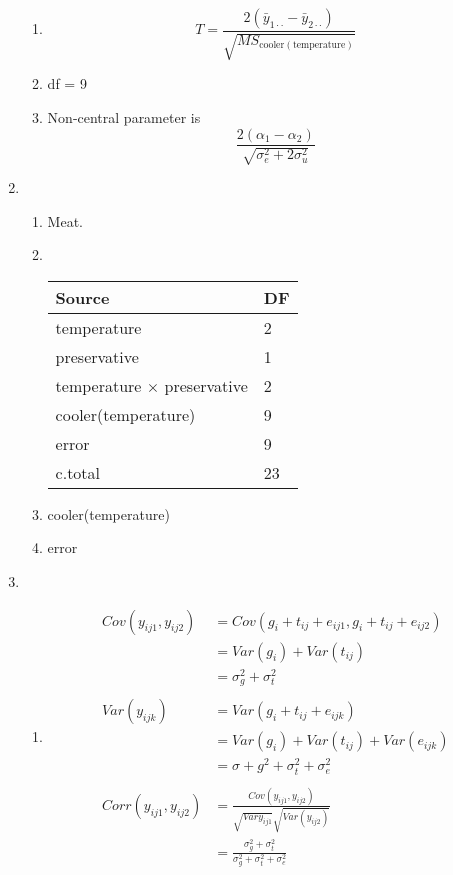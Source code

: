 \documentclass{article}
\begin{document}
\begin{enumerate}[leftmargin = 0 em, label = \arabic*., font = \bfseries]
\begin{enumerate}
	\item 
	\[T = \frac{2 (\bar{y}_{1 \cdot \cdot } - \bar{y}_{2 \cdot \cdot})}{\sqrt{MS_{\mathrm{cooler(temperature)}}}}\]

	\item 
	df = 9 
	\item 
	Non-central parameter is 
	\[\frac{2 (\alpha_1 - \alpha_2)}{\sqrt{\sigma_e^2 + 2 \sigma_{u}^2}}\]

	\end{enumerate}

	\item 
	\begin{enumerate}
		\item 
	Meat.
	\item \ 

	\begin{tabular}{ll}
	\toprule
	Source & DF \\
	\midrule
	temperature & 2\\
	preservative & 1\\
	temperature $\times$ preservative & 2 \\
	cooler(temperature) & 9\\
	error & 9\\
	\midrule
	c.total & 23 \\
	\bottomrule
	\end{tabular}

	\item 
	cooler(temperature)

	\item 
	error
		\end{enumerate}

	\item 
	\begin{enumerate}
		\item 
		\begin{align*}
		Cov(y_{ij1}, y_{ij2}) &= Cov(g_i + t_{ij} + e_{ij1} , g_i + t_{ij} + e_{ij2})\\
		& = Var(g_i) + Var(t_{ij})\\
		& = \sigma_g^2 + \sigma_t^2\\
		\\
		Var(y_{ijk}) & = Var(g_i + t_{ij} + e_{ijk})\\
		& = Var(g_i) + Var(t_{ij}) + Var(e_{ijk})\\
		& = \sigma+g^2 + \sigma_t^2 + \sigma_e^2 \\
		\\
		Corr(y_{ij1}, y_{ij2}) & = \frac{Cov(y_{ij1}, y_{ij2})}{\sqrt{Var{y_{ij1}}} \sqrt{Var(y_{ij2})}}\\
		& = \frac{\sigma_g^2 + \sigma_t^2}{\sigma_g^2 + \sigma_t^2 + \sigma_e^2}
		\end{align*}


\end{enumerate}
\end{enumerate}
\end{document}
